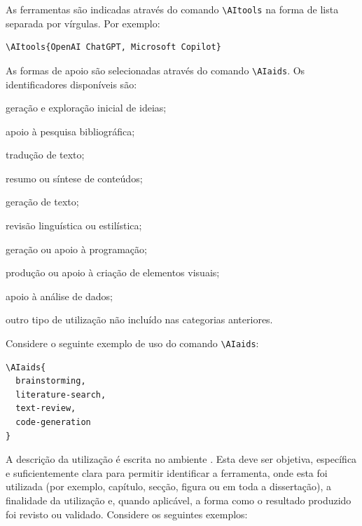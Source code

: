 As ferramentas são indicadas através do comando \verb|\AItools| na forma de lista separada por vírgulas. Por exemplo:
\begin{verbatim}
\AItools{OpenAI ChatGPT, Microsoft Copilot}
\end{verbatim}

As formas de apoio são selecionadas através do comando \verb|\AIaids|. Os identificadores disponíveis são:

\begin{description}[
  leftmargin=4.2cm,
  labelwidth=3.8cm,
  labelsep=0.4cm,
  style=multiline
]
    \item[\code{brainstorming}] geração e exploração inicial de ideias;
    \item[\code{literature-search}] apoio à pesquisa bibliográfica;
    \item[\code{translation}] tradução de texto;
    \item[\code{summarization}] resumo ou síntese de conteúdos;
    \item[\code{text-generation}] geração de texto;
    \item[\code{text-review}] revisão linguística ou estilística;
    \item[\code{code-generation}] geração ou apoio à programação;
    \item[\code{visualization}] produção ou apoio à criação de elementos visuais;
    \item[\code{data-analysis}] apoio à análise de dados;
    \item[\code{other}] outro tipo de utilização não incluído nas categorias
    anteriores.
\end{description}

Considere o seguinte exemplo de uso do comando \verb|\AIaids|:
\begin{verbatim}
\AIaids{
  brainstorming,
  literature-search,
  text-review,
  code-generation
}
\end{verbatim}

A descrição da utilização é escrita no ambiente . Esta deve ser objetiva, específica e suficientemente clara para permitir identificar a ferramenta, onde esta foi utilizada (por exemplo, capítulo, secção, figura ou em toda a dissertação), a finalidade da utilização e, quando aplicável, a forma como o resultado produzido foi revisto ou validado. Considere os seguintes exemplos:

